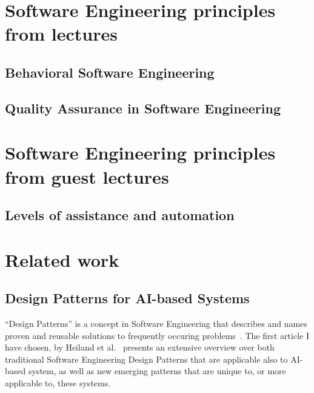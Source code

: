 \documentclass[a4paper,twocolumn]{article}
\begin{document}
\section*{Software Engineering principles from lectures}

\subsection*{Behavioral Software Engineering}

\subsection*{Quality Assurance in Software Engineering}

\section*{Software Engineering principles from guest lectures}

\subsection*{Levels of assistance and automation}

\section*{Related work}

\subsection*{Design Patterns for AI-based Systems}

``Design Patterns'' is a concept in Software Engineering that describes and
names proven and reusable solutions to frequently occuring
problems~\cite{Gamma2001}. The first article I have chosen, by Heiland et al.~\cite{heiland_design_2023} presents an
extensive overview over both traditional Software Engineering Design Patterns
that are applicable also to AI-based system, as well as new emerging patterns
that are unique to, or more applicable to, these systems.




\end{document}
